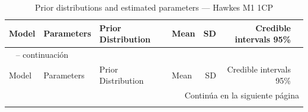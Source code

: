 \begin{longtable}{llllrrr}
\caption{Prior distributions and estimated parameters --- Hawkes M1 1CP} \label{tab:hawkes_params_1cp} \\
\toprule
Model & Parameters & Prior Distribution & Mean & SD & Credible intervals 95\% \\
\midrule
\endfirsthead

\multicolumn{7}{l}{\tablename\ \thetable{} -- continuaci\'{o}n} \\
\toprule
Model & Parameters & Prior Distribution & Mean & SD & Credible intervals 95\% \\
\midrule
\endhead

\midrule
\multicolumn{7}{r}{Contin\'{u}a en la siguiente p\'{a}gina} \\
\endfoot

\bottomrule
\endlastfoot


\end{longtable}
